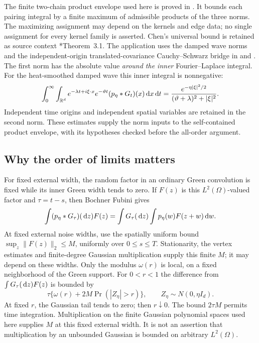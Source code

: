 The finite two-chain product envelope used here is proved in
. It bounds each pairing integral by a
finite maximum of admissible products of the three norms. The maximizing
assignment may depend on the kernels and edge data; no single assignment for
every kernel family is asserted. Chen's universal bound is retained as source
context \cite{chen:author2026:time-dependency}*{Theorem~3.1}. The application
uses the damped wave norms and the independent-origin translated-covariance
Cauchy--Schwarz bridge in  and
. The first norm has the absolute value
\emph{around the inner} Fourier--Laplace integral. For the heat-smoothed damped
wave this inner integral is nonnegative:
\[
  \int_0^\infty\int_{\mathbb R^d}e^{-\lambda t+i\xi\cdot x}
  e^{-\vartheta t}(p_\eta*G_t)(x)\,\mathrm d x\,\mathrm d t
  =\frac{e^{-\eta|\xi|^2/2}}{(\vartheta+\lambda)^2+|\xi|^2}.
\]
Independent time origins and independent spatial variables are retained in the
second norm. These estimates supply the norm inputs to the self-contained
product envelope, with its hypotheses checked before the all-order argument.

\subsection{Why the order of limits matters}

For fixed external width, the random factor in an ordinary Green convolution is
fixed while its inner Green width tends to zero. If $F(z)$ is this
$L^2(\Omega)$-valued factor and $\tau = t-s$, then Bochner Fubini gives
\[
  \int(p_\eta*G_\tau)(\,\mathrm d z)F(z)
  =\int G_\tau(\,\mathrm d z)\int p_\eta(w)F(z+w)\,\mathrm d w.
\]
At fixed external noise widths, use the spatially uniform bound
$\sup_z\|F(z)\|_2 \le M$, uniformly over $0 \le s \le T$. Stationarity, the
vertex estimates and finite-degree Gaussian multiplication supply this finite
$M$; it may depend on these widths. Only the modulus $\omega(r)$ is local, on a
fixed neighborhood of the Green support. For $0 < r < 1$ the difference from
$\int G_\tau(\,\mathrm d z)F(z)$ is bounded by
\begin{equation}\label{E:reader-green}
  \tau\{\omega(r)+2M\Pr(|Z_\eta|>r)\},\qquad
  Z_\eta\sim N(0,\eta I_d).
\end{equation}
At fixed $r$, the Gaussian tail tends to zero; then $r\downarrow0$. The bound
$2\tau M$ permits time integration. Multiplication on the finite Gaussian
polynomial spaces used here supplies $M$ at this fixed external width. It is not
an assertion that multiplication by an unbounded Gaussian is bounded on
arbitrary $L^2(\Omega)$.


